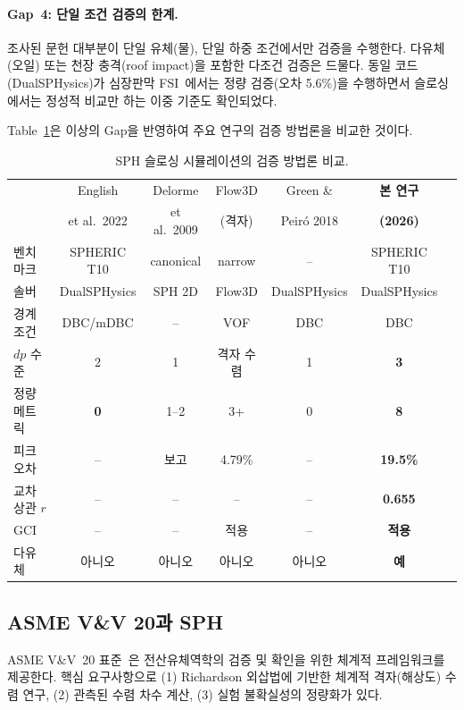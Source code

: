 \documentclass[11pt]{article}
\begin{document}
\paragraph{Gap~4: 단일 조건 검증의 한계.}
조사된 문헌 대부분이 단일 유체(물), 단일 하중 조건에서만 검증을 수행한다.
다유체(오일) 또는 천장 충격(roof impact)을 포함한 다조건 검증은 드물다.
동일 코드(DualSPHysics)가 심장판막 FSI~\cite{Laha2024}에서는 정량 검증(오차 5.6\%)을
수행하면서 슬로싱에서는 정성적 비교만 하는 이중 기준도 확인되었다.

Table~\ref{tab:lit-comparison}은 이상의 Gap을 반영하여 주요 연구의 검증 방법론을
비교한 것이다.

\begin{table}[H]
\caption{SPH 슬로싱 시뮬레이션의 검증 방법론 비교.}
\label{tab:lit-comparison}
\centering
\small
\begin{tabular}{@{}lcccccc@{}}
\toprule
& English & Delorme & Flow3D & Green \& & \textbf{본 연구} \\
& et al.~2022 & et al.~2009 & (격자) & Peir\'o 2018 & \textbf{(2026)} \\
\midrule
벤치마크 & SPHERIC T10 & canonical & narrow & -- & SPHERIC T10 \\
솔버 & DualSPHysics & SPH 2D & Flow3D & DualSPHysics & DualSPHysics \\
경계 조건 & DBC/mDBC & -- & VOF & DBC & DBC \\
$dp$ 수준 & 2 & 1 & 격자 수렴 & 1 & \textbf{3} \\
정량 메트릭 & \textbf{0} & 1--2 & 3+ & 0 & \textbf{8} \\
피크 오차 & -- & 보고 & 4.79\% & -- & \textbf{19.5\%} \\
교차상관 $r$ & -- & -- & -- & -- & \textbf{0.655} \\
GCI & -- & -- & 적용 & -- & \textbf{적용} \\
다유체 & 아니오 & 아니오 & 아니오 & 아니오 & \textbf{예} \\
\bottomrule
\end{tabular}
\end{table}


\subsection{ASME V\&V 20과 SPH} \label{sec:vv20}

ASME V\&V~20 표준~\cite{ASME2009}은 전산유체역학의 검증 및 확인을 위한 체계적
프레임워크를 제공한다. 핵심 요구사항으로 (1) Richardson 외삽법에 기반한 체계적
격자(해상도) 수렴 연구, (2) 관측된 수렴 차수 계산, (3) 실험 불확실성의 정량화가 있다.
\end{document}
